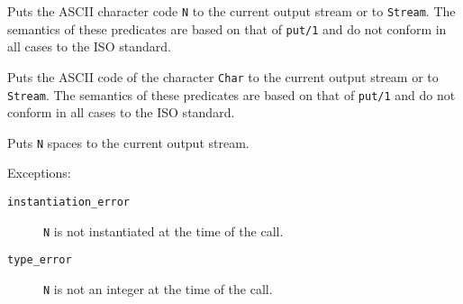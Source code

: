 \begin{description}
\vspace{-7mm} 
    Puts the ASCII character code {\tt N} to the current output stream
    or to {\tt Stream}.  The semantics of these predicates are based
    on that of {\tt put/1} and do not conform in all cases to the ISO
    standard.

\vspace{-7mm} 
    Puts the ASCII code of the character {\tt Char} to the current
    output stream or to {\tt Stream}.  The semantics of these
    predicates are based on that of {\tt put/1} and do not conform in
    all cases to the ISO standard.


    Puts {\tt N} spaces to the current output stream. 

    Exceptions:
    \begin{description}
    \item[{\tt instantiation\_error}]
	{\tt N} is not instantiated at the time of the call.
    \item[{\tt type\_error}]
	{\tt N} is not an integer at the time of the call.
    \end{description}
\end{description}

